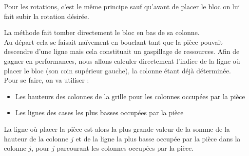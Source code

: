 \medskip

Pour les rotations, c'est le même principe sauf qu'avant de placer le bloc on lui fait subir la rotation désirée.

\medskip

La méthode  fait tomber directement le bloc en bas de sa colonne.\\
Au départ cela se faisait naïvement en bouclant tant que la pièce pouvait descendre d'une ligne mais cela constituait un gaspillage de ressources. Afin de gagner en performances, nous allons calculer directement l'indice de la ligne où placer le bloc (son coin supérieur gauche), la colonne étant déjà déterminée.\\
Pour se faire, on va utiliser :
\begin{itemize}
	\item Les hauteurs des colonnes de la grille pour les colonnes occupées par la pièce
	\item Les lignes des cases les plus basses occupées par la pièce
\end{itemize}
La ligne où placer la pièce est alors la plus grande valeur de la somme de la hauteur de la colonne $j$ et de la ligne la plus basse occupée par la pièce dans la colonne $j$, pour $j$ parcourant les colonnes occupées par la pièce.

